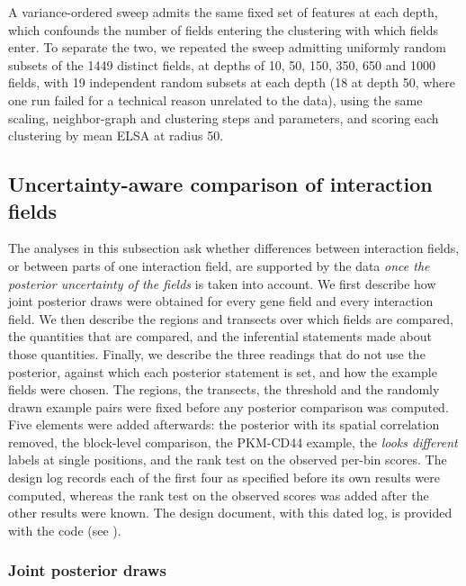\documentclass[10pt,letterpaper]{article}
\begin{document}
A variance-ordered sweep admits the same fixed set of features at each depth, which confounds the number of fields entering the clustering with which fields enter. To separate the two, we repeated the sweep admitting uniformly random subsets of the 1449 distinct fields, at depths of 10, 50, 150, 350, 650 and 1000 fields, with 19 independent random subsets at each depth (18 at depth 50, where one run failed for a technical reason unrelated to the data), using the same scaling, neighbor-graph and clustering steps and parameters, and scoring each clustering by mean ELSA at radius 50.

\subsection*{Uncertainty-aware comparison of interaction fields}
\label{sec:meth-uq}

The analyses in this subsection ask whether differences between interaction fields, or between parts of one interaction field, are supported by the data \emph{once the posterior uncertainty of the fields} is taken into account. We first describe how joint posterior draws were obtained for every gene field and every interaction field. We then describe the regions and transects over which fields are compared, the quantities that are compared, and the inferential statements made about those quantities. Finally, we describe the three readings that do not use the posterior, against which each posterior statement is set, and how the example fields were chosen. The regions, the transects, the threshold and the randomly drawn example pairs were fixed before any posterior comparison was computed. Five elements were added afterwards: the posterior with its spatial correlation removed, the block-level comparison, the PKM-CD44 example, the \textit{looks different} labels at single positions, and the rank test on the observed per-bin scores. The design log records each of the first four as specified before its own results were computed, whereas the rank test on the observed scores was added after the other results were known. The design document, with this dated log, is provided with the code (see ).

\subsubsection*{Joint posterior draws}
\label{sec:meth-draws}
\end{document}
